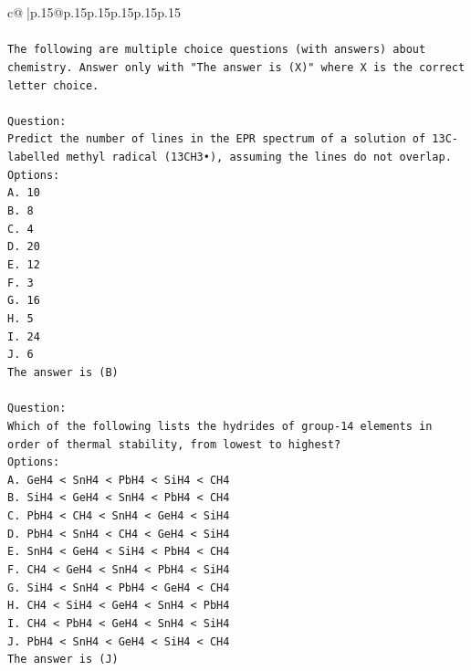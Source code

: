 \documentclass{article}
\begin{document}
{\begin{supertabular}{c@{$\;$}|p{.15\linewidth}@{}p{.15\linewidth}p{.15\linewidth}p{.15\linewidth}p{.15\linewidth}p{.15\linewidth}}
{{{\\ 
\\ 
\texttt{The following are multiple choice questions (with answers) about chemistry. Answer only with "The answer is (X)" where X is the correct letter choice.} \\
\\ 
\texttt{Question:} \\
\texttt{Predict the number of lines in the EPR spectrum of a solution of 13C{-}labelled methyl radical (13CH3•), assuming the lines do not overlap.} \\
\texttt{Options:} \\
\texttt{A. 10} \\
\texttt{B. 8} \\
\texttt{C. 4} \\
\texttt{D. 20} \\
\texttt{E. 12} \\
\texttt{F. 3} \\
\texttt{G. 16} \\
\texttt{H. 5} \\
\texttt{I. 24} \\
\texttt{J. 6} \\
\texttt{The answer is (B)} \\
\\ 
\texttt{Question:} \\
\texttt{Which of the following lists the hydrides of group{-}14 elements in order of thermal stability, from lowest to highest?} \\
\texttt{Options:} \\
\texttt{A. GeH4 < SnH4 < PbH4 < SiH4 < CH4} \\
\texttt{B. SiH4 < GeH4 < SnH4 < PbH4 < CH4} \\
\texttt{C. PbH4 < CH4 < SnH4 < GeH4 < SiH4} \\
\texttt{D. PbH4 < SnH4 < CH4 < GeH4 < SiH4} \\
\texttt{E. SnH4 < GeH4 < SiH4 < PbH4 < CH4} \\
\texttt{F. CH4 < GeH4 < SnH4 < PbH4 < SiH4} \\
\texttt{G. SiH4 < SnH4 < PbH4 < GeH4 < CH4} \\
\texttt{H. CH4 < SiH4 < GeH4 < SnH4 < PbH4} \\
\texttt{I. CH4 < PbH4 < GeH4 < SnH4 < SiH4} \\
\texttt{J. PbH4 < SnH4 < GeH4 < SiH4 < CH4} \\
\texttt{The answer is (J)} \\
\\ 
}}}
\end{supertabular}}
\end{document}
